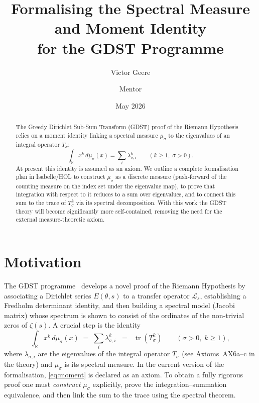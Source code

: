 \documentclass[12pt,a4paper]{article}
\title{\bfseries Formalising the Spectral Measure and Moment Identity \\ for the GDST Programme}
\author{Victor Geere \and Mentor}
\date{May 2026}
\begin{document}
\maketitle

\begin{abstract}
The Greedy Dirichlet Sub‑Sum Transform (GDST) proof of the Riemann Hypothesis relies on a 
moment identity linking a spectral measure $\mu_\sigma$ to the eigenvalues of an integral 
operator $T_\sigma$:
\[
\int_{\mathbb{R}} x^k \, d\mu_\sigma(x) = \sum_{i} \lambda_{\sigma,i}^k \qquad (k\ge 1,\; \sigma>0).
\]
At present this identity is assumed as an axiom. We outline a complete formalisation plan in 
Isabelle/HOL to construct $\mu_\sigma$ as a discrete measure (push‑forward of the counting 
measure on the index set under the eigenvalue map), to prove that integration with respect to 
it reduces to a sum over eigenvalues, and to connect this sum to the trace of $T_\sigma^k$ via 
its spectral decomposition. With this work the GDST theory will become significantly more 
self‑contained, removing the need for the external measure‑theoretic axiom.
\end{abstract}

\section{Motivation}
The GDST programme~\cite{Geere2026} develops a novel proof of the Riemann Hypothesis by 
associating a Dirichlet series $E(\theta,s)$ to a transfer operator $\mathcal{L}_s$, 
establishing a Fredholm determinant identity, and then building a spectral model (Jacobi matrix) 
whose spectrum is shown to consist of the ordinates of the non‑trivial zeros of $\zeta(s)$. 
A crucial step is the identity
\begin{equation}\label{eq:moment}
\int_{\mathbb{R}} x^k \, d\mu_\sigma(x) \;=\; \sum_{i} \lambda_{\sigma,i}^k
\;\;=\;\; \operatorname{tr}(T_\sigma^k) \qquad (\sigma>0,\;k\ge 1),
\end{equation}
where $\lambda_{\sigma,i}$ are the eigenvalues of the integral operator $T_\sigma$ (see 
Axioms~AX6a–c in the theory) and $\mu_\sigma$ is its spectral measure. In the current version 
of the formalisation, \eqref{eq:moment} is declared as an axiom.  To obtain a fully rigorous 
proof one must \emph{construct} $\mu_\sigma$ explicitly, prove the integration--summation 
equivalence, and then link the sum to the trace using the spectral theorem.
\end{document}
